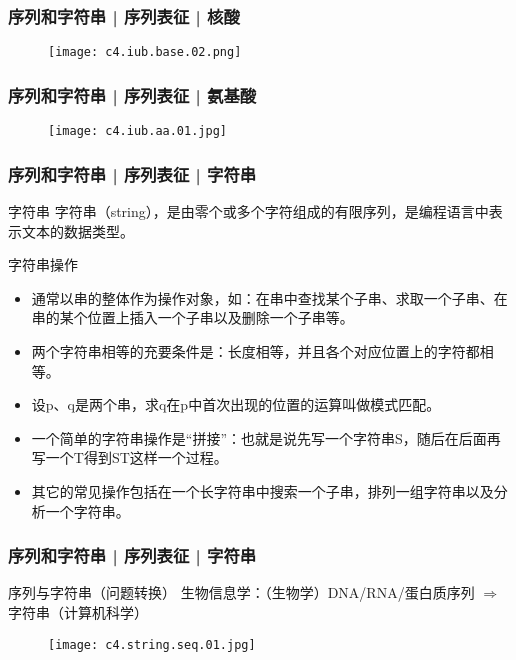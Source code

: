 \begin{frame}
  \frametitle{序列和字符串 | 序列表征 | 核酸}
  \begin{figure}
    \centering
    \texttt{[image: c4.iub.base.02.png]}
  \end{figure}
\end{frame}

\begin{frame}
  \frametitle{序列和字符串 | 序列表征 | 氨基酸}
  \begin{figure}
    \centering
    \texttt{[image: c4.iub.aa.01.jpg]}
  \end{figure}
\end{frame}

\begin{frame}
  \frametitle{序列和字符串 | 序列表征 | 字符串}
  \begin{block}{字符串}
    字符串（string），是由零个或多个字符组成的有限序列，是编程语言中表示文本的数据类型。
  \end{block}
  \pause
  \begin{block}{字符串操作}
    \begin{itemize}
      \item 通常以串的整体作为操作对象，如：在串中查找某个子串、求取一个子串、在串的某个位置上插入一个子串以及删除一个子串等。
      \item 两个字符串相等的充要条件是：长度相等，并且各个对应位置上的字符都相等。
      \item 设p、q是两个串，求q在p中首次出现的位置的运算叫做模式匹配。
      \item 一个简单的字符串操作是“拼接”：也就是说先写一个字符串S，随后在后面再写一个T得到ST这样一个过程。
      \item 其它的常见操作包括在一个长字符串中搜索一个子串，排列一组字符串以及分析一个字符串。
    \end{itemize}
  \end{block}
\end{frame}

\begin{frame}
  \frametitle{序列和字符串 | 序列表征 | 字符串}
  \begin{block}{序列与字符串\alert{（问题转换）}}
    生物信息学：（生物学）DNA/RNA/蛋白质序列 $\Longrightarrow$ 字符串（计算机科学）
  \end{block}
  \begin{figure}
    \centering
    \texttt{[image: c4.string.seq.01.jpg]}
  \end{figure}
\end{frame}

